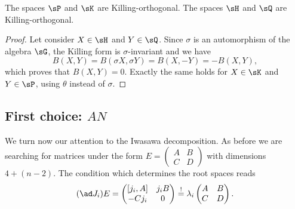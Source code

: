 \begin{proposition}
	The spaces $\sP$ and $\sK$ are Killing-orthogonal. The spaces $\sH$ and $\sQ$ are Killing-orthogonal.
\end{proposition}

\begin{proof}
	Let consider $X\in\sH$ and $Y\in\sQ$. Since $\sigma$ is an automorphism of the algebra $\sG$, the Killing form is $\sigma$-invariant and we have
	\begin{equation}
		B(X,Y)=B(\sigma X,\sigma Y)=B(X,-Y)=-B(X,Y),
	\end{equation}
	which proves that $B(X,Y)=0$. Exactly the same holds for $X\in\sK$ and $Y\in\sP$, using $\theta$ instead of $\sigma$.
\end{proof}

\subsection{First choice: \texorpdfstring{$AN$}{AN}}\label{subsecIwasawa_deux}

We turn now our attention to the Iwasawa decomposition. As before we are searching for matrices under the form $E=\begin{pmatrix}A&B\\C&D\end{pmatrix}$ with dimensions $4+(n-2)$. The condition which determines the root spaces reads
\begin{equation}
  (\ad J_i)E=
\begin{pmatrix}
  [j_i,A]&j_iB\\
  -Cj_i&0
\end{pmatrix}
\stackrel{!}{=}\lambda_i
\begin{pmatrix}A&B\\C&D\end{pmatrix}.
\end{equation}


